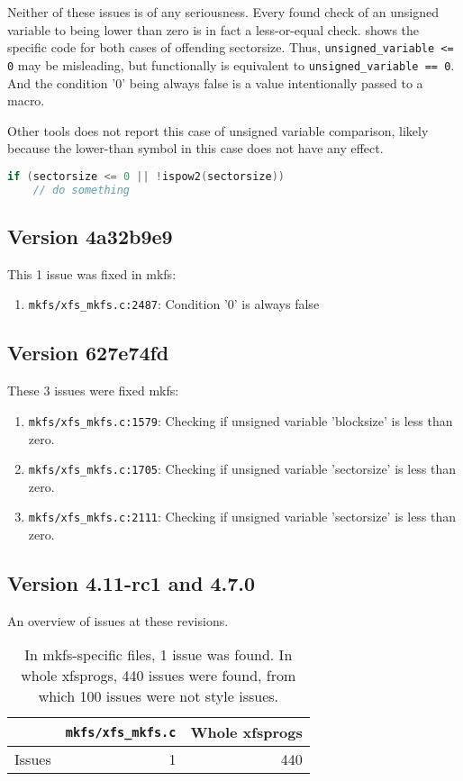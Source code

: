Neither of these issues is of any seriousness. Every found check of an
unsigned variable to being lower than zero is in fact a less-or-equal
check.  shows the specific code for both cases
of offending sectorsize. Thus, {\tt unsigned\_variable <= 0} may be
misleading, but functionally is equivalent to {\tt unsigned\_variable ==
0}.  And the condition '0' being always false is a value intentionally
passed to a macro.

Other tools does not report this case of unsigned variable comparison,
likely because the lower-than symbol in this case does not have any effect.

\begin{lstlisting}[frame=none, basicstyle=\footnotesize\ttfamily,
language=C, numbers=none, numberstyle=\tiny\color{black},caption=
{Condition in which unsigned sectorsize is tested to be less than zero.},
label={lst:results:sectorsize}]
if (sectorsize <= 0 || !ispow2(sectorsize))
	// do something
\end{lstlisting}

\subsection{Version 4a32b9e9}
This 1 issue was fixed in mkfs:
\begin{enumerate}
	\item {\tt mkfs/xfs\_mkfs.c:2487}: Condition '0' is always false
\end{enumerate}

\subsection{Version 627e74fd}
These 3 issues were fixed mkfs:
\begin{enumerate}
	\item {\tt mkfs/xfs\_mkfs.c:1579}: Checking if unsigned variable 'blocksize' is less than zero.
	\item {\tt mkfs/xfs\_mkfs.c:1705}: Checking if unsigned variable
		'sectorsize' is less than zero.
	\item {\tt mkfs/xfs\_mkfs.c:2111}: Checking if unsigned variable
		'sectorsize' is less than zero.
\end{enumerate}

\subsection{Version 4.11-rc1 and 4.7.0}
An overview of issues at these revisions.
\begin{table}[h]
\begin{tabular}{|l||r||r|}
\hline
& {\tt mkfs/xfs\_mkfs.c} & Whole xfsprogs \\
\hline
Issues & 1 & 440 \\
\hline
\end{tabular}
\caption{In mkfs-specific files, 1 issue was found. In whole xfsprogs, 440
issues were found, from which 100 issues were not style issues.}
\end{table}

